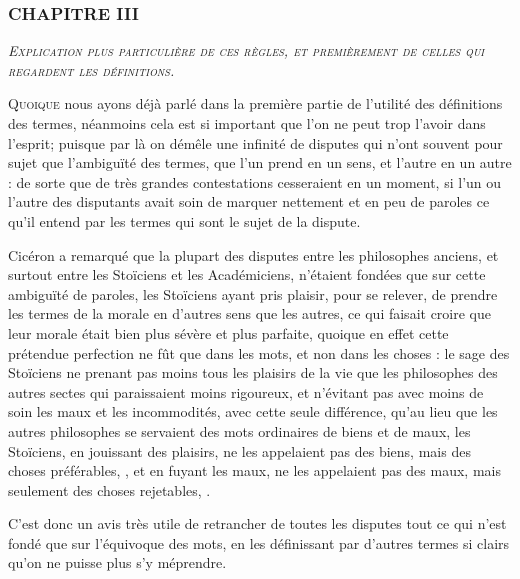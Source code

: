 \subsubsection{\centering \Large CHAPITRE III}
\begin{center}\emph{\large\scshape Explication plus particulière de ces règles, et premièrement de celles qui regardent les définitions.}\end{center}

	\lettrine{Q}{uoique} nous ayons déjà parlé dans la première partie de l'utilité des définitions des termes, néanmoins cela est si important que l'on ne peut trop l'avoir dans l'esprit; puisque par là on démêle une infinité de disputes qui n'ont souvent pour sujet que l'ambiguïté des termes, que l'un prend en un sens, et l'autre en un autre : de sorte que de très grandes contestations cesseraient en un moment, si l'un ou l'autre des disputants avait soin de marquer nettement et en peu de paroles ce qu'il entend par les termes qui sont le sujet de la dispute.

Cicéron a remarqué que la plupart des disputes entre les philosophes anciens, et surtout entre les Stoïciens et les Académiciens, n'étaient fondées que sur cette ambiguïté de paroles, les Stoïciens ayant pris plaisir, pour se relever, de prendre les termes de la morale en d'autres sens que les autres, ce qui faisait croire que leur morale était bien plus sévère et plus parfaite, quoique en effet cette prétendue perfection ne fût que dans les mots, et non dans les choses : le sage des Stoïciens ne prenant pas moins tous les plaisirs de la vie que les philosophes des autres sectes qui paraissaient moins rigoureux, et n'évitant pas avec moins de soin les maux et les incommodités, avec cette seule différence, qu'au lieu que les autres philosophes se servaient des mots ordinaires de biens et de maux, les Stoïciens, en jouissant des plaisirs, ne les appelaient pas des biens, mais des choses préférables, \emph{{}}, et en fuyant les maux, ne les appelaient pas des maux, mais seulement des choses rejetables, \emph{{}}.

C'est donc un avis très utile de retrancher de toutes les disputes tout ce qui n'est fondé que sur l'équivoque des mots, en les définissant par d'autres termes si clairs qu'on ne puisse plus s'y méprendre.

